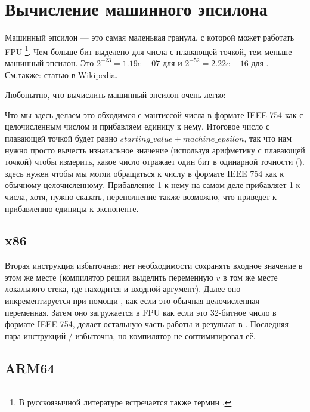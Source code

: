 ﻿\section{Вычисление машинного эпсилона}

Машинный эпсилон --- это самая маленькая гранула, с которой может работать \ac{FPU} 
\footnote{В русскоязычной литературе встречается также термин .}.
Чем больше бит выделено для числа с плавающей точкой, тем меньше машинный эпсилон.
Это $2^{-23} = 1.19e-07$ для \Tfloat и $2^{-52} = 2.22e-16$ для \Tdouble.
См.также: \href{http://link.yurichev.com/17368}{статью в Wikipedia}.

Любопытно, что вычислить машинный эпсилон очень легко:



Что мы здесь делаем это обходимся с мантиссой числа в формате IEEE 754 как с целочисленным числом и прибавляем
единицу к нему.
Итоговое число с плавающей точкой будет равно $starting\_value+machine\_epsilon$, так что нам
нужно просто вычесть изначальное значение (используя арифметику с плавающей точкой) чтобы измерить, 
какое число отражает один бит в одинарной точности (\Tfloat).
 здесь нужен чтобы мы могли обращаться к числу в формате IEEE 754 как к обычному целочисленному.
Прибавление 1 к нему на самом деле прибавляет 1 к  числа, хотя, нужно сказать,
переполнение также возможно, что приведет к прибавлению единицы к экспоненте.

\subsection{x86}



Вторая инструкция  избыточная: нет необходимости сохранять входное значение в этом же месте
(компилятор решил выделить переменную $v$ в том же месте локального стека, где находится и 
входной аргумент).
Далее оно инкрементируется при помощи , как если это обычная целочисленная переменная.
Затем оно загружается в FPU как если это 32-битное число в формате IEEE 754,  делает остальную
часть работы и результат в .
Последняя пара инструкций / избыточна, но компилятор не соптимизировал её.

\subsection{ARM64}


